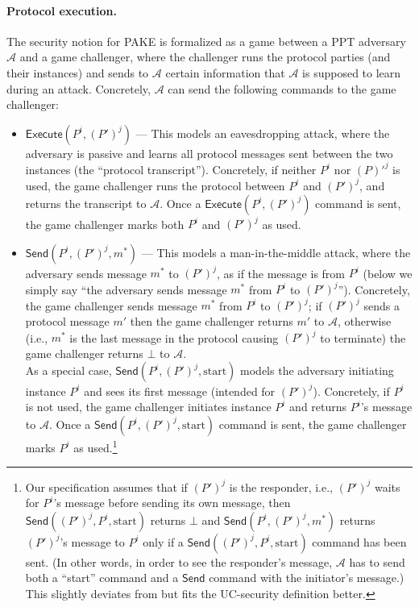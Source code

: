 \documentclass{article}
\newcommand{\adv}{\mathcal{A}}
\newcommand{\Execute}{\mathsf{Execute}}
\newcommand{\Send}{\mathsf{Send}}
\begin{document}
\paragraph{Protocol execution.}
The security notion for PAKE is formalized as a game between a PPT adversary $\adv$ and a game challenger, where the challenger runs the protocol parties (and their instances) and sends to $\adv$ certain information that $\adv$ is supposed to learn during an attack. Concretely, $\adv$ can send the following commands to the game challenger:
\begin{itemize}
  \item $\Execute(P^i, (P')^j)$ --- This models an eavesdropping attack, where the adversary is passive and learns all protocol messages sent between the two instances (the ``protocol transcript''). Concretely, if neither $P^i$ nor $(P)'^j$ is used, the game challenger runs the protocol between $P^i$ and $(P')^j$, and returns the transcript to $\adv$. Once a $\Execute(P^i, (P')^j)$ command is sent, the game challenger marks both $P^i$ and $(P')^j$ as used.
  \item $\Send(P^i, (P')^j, m^*)$ --- This models a man-in-the-middle attack, where the adversary sends message $m^*$ to $(P')^j$, as if the message is from $P^i$ (below we simply say ``the adversary sends message $m^*$ from $P^i$ to $(P')^j$''). Concretely, the game challenger sends message $m^*$ from $P^i$ to $(P')^j$; if $(P')^j$ sends a protocol message $m'$ then the game challenger returns $m'$ to $\adv$, otherwise (i.e., $m^*$ is the last message in the protocol causing $(P')^j$ to terminate) the game challenger returns $\bot$ to $\adv$. \\
      As a special case, $\Send(P^i, (P')^j, \text{start})$ models the adversary initiating instance $P^i$ and sees its first message (intended for $(P')^j$). Concretely, if $P^i$ is not used, the game challenger initiates instance $P^i$ and returns $P^i$'s message to $\adv$. Once a $\Send(P^i, (P')^j, \text{start})$ command is sent, the game challenger marks $P^i$ as used.\footnote{Our specification assumes that if $(P')^j$ is the responder, i.e., $(P')^j$ waits for $P^i$'s message before sending its own message, then $\Send((P')^j, P^i, \text{start})$ returns $\bot$ and $\Send(P^i, (P')^j, m^*)$ returns $(P')^j$'s message to $P^i$ only if a $\Send((P')^j, P^i, \text{start})$ command has been sent. (In other words, in order to see the responder's message, $\adv$ has to send both a ``start'' command and a $\Send$ command with the initiator's message.) This slightly deviates from \cite{EC:BelPoiRog00,JACM:KatOstYun09} but fits the UC-security definition better.}
\end{itemize}
\end{document}
